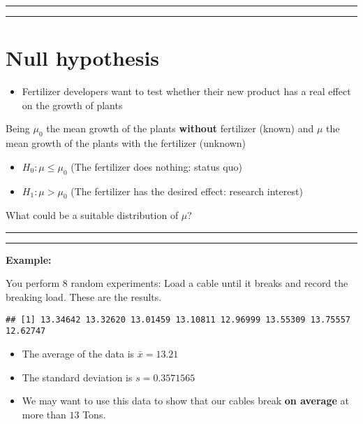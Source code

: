 \documentclass[
]{book}
\providecommand{\tightlist}{%
  \setlength{\itemsep}{0pt}\setlength{\parskip}{0pt}}
\begin{document}
\begin{center}\rule{0.5\linewidth}{0.5pt}\end{center}

\begin{center}\rule{0.5\linewidth}{0.5pt}\end{center}

\hypertarget{null-hypothesis-1}{%
\section{Null hypothesis}\label{null-hypothesis-1}}

\begin{itemize}
\tightlist
\item
  Fertilizer developers want to test whether their new product has a real effect on the growth of plants
\end{itemize}

Being \(\mu_0\) the mean growth of the plants \textbf{without} fertilizer (known) and \(\mu\) the mean growth of the plants with the fertilizer (unknown)

\begin{itemize}
\tightlist
\item
  \(H_0:\mu \leq \mu_0\) (The fertilizer does nothing: status quo)
\item
  \(H_1:\mu > \mu_0\) (The fertilizer has the desired effect: research interest)
\end{itemize}

What could be a suitable distribution of \(\mu\)?

\begin{center}\rule{0.5\linewidth}{0.5pt}\end{center}

\begin{center}\rule{0.5\linewidth}{0.5pt}\end{center}

\textbf{Example:}

You perform \(8\) random experiments: Load a cable until it breaks and record the breaking load. These are the results.

\begin{verbatim}
## [1] 13.34642 13.32620 13.01459 13.10811 12.96999 13.55309 13.75557 12.62747
\end{verbatim}

\begin{itemize}
\tightlist
\item
  The average of the data is \(\bar{x}=13.21\)
\item
  The standard deviation is \(s=0.3571565\)
\item
  We may want to use this data to show that our cables break \textbf{on average} at more than \(13\) Tons.
\end{itemize}
\end{document}
